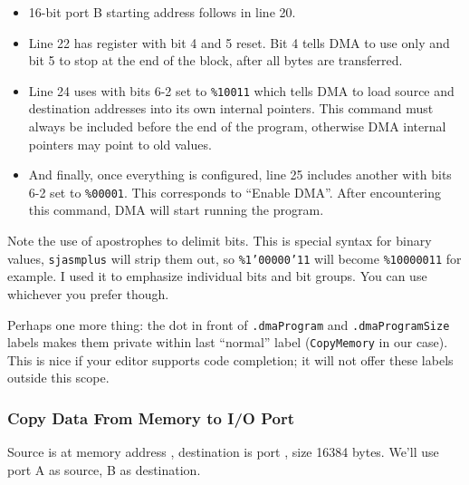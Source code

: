 {\begin{itemize}[topsep=1pt,itemsep=1pt]

	\item 16-bit port B starting address follows in line 20.
	
	\item Line 22 has  register with bit 4 and 5 reset. Bit 4 tells DMA to use  only and bit 5 to stop at the end of the block, after all bytes are transferred.
	
	\item Line 24 uses  with bits 6-2 set to {\tt \%10011} which tells DMA to load source and destination addresses into its own internal pointers. This command must always be included before the end of the program, otherwise DMA internal pointers may point to old values.
	
	\item And finally, once everything is configured, line 25 includes another  with bits 6-2 set to {\tt \%00001}. This corresponds to ``Enable DMA''. After encountering this command, DMA will start running the program.
\end{itemize}

Note the use of apostrophes to delimit bits. This is special syntax for binary values, {\tt sjasmplus} will strip them out, so {\tt \%1'00000'11} will become {\tt \%10000011} for example. I used it to emphasize individual bits and bit groups. You can use whichever you prefer though.

Perhaps one more thing: the dot in front of {\tt .dmaProgram} and {\tt .dmaProgramSize} labels makes them private within last ``normal'' label ({\tt CopyMemory} in our case). This is nice if your editor supports code completion; it will not offer these labels outside this scope.



\pagebreak
\subsubsection{Copy Data From Memory to I/O Port}

Source is at memory address , destination is port , size 16384 bytes. We'll use port A as source, B as destination.

}
